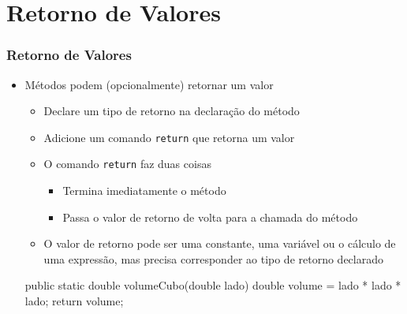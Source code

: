 \documentclass[xcolor={dvipsnames,table},aspectratio=169]{beamer}
\begin{document}
\section{Retorno de Valores}

\begin{frame}[fragile]\frametitle{Retorno de Valores}
\begin{itemize}
	\item Métodos podem (opcionalmente) retornar um valor
	\begin{itemize}
		\item Declare um tipo de retorno na declaração do método
		\item Adicione um comando \texttt{return} que retorna um valor
		\item O comando \texttt{return} faz duas coisas
		\begin{itemize}
			\item Termina imediatamente o método
			\item Passa o valor de retorno de volta para a chamada do método
		\end{itemize}
		\item O valor de retorno pode ser uma constante, uma variável ou o cálculo de uma expressão, mas precisa corresponder ao tipo de retorno declarado
	\end{itemize}
\begin{javacode}
public static double volumeCubo(double lado) {
   double volume = lado * lado * lado;
   return volume;
}
\end{javacode}
\end{itemize}
\end{frame}
\end{document}
